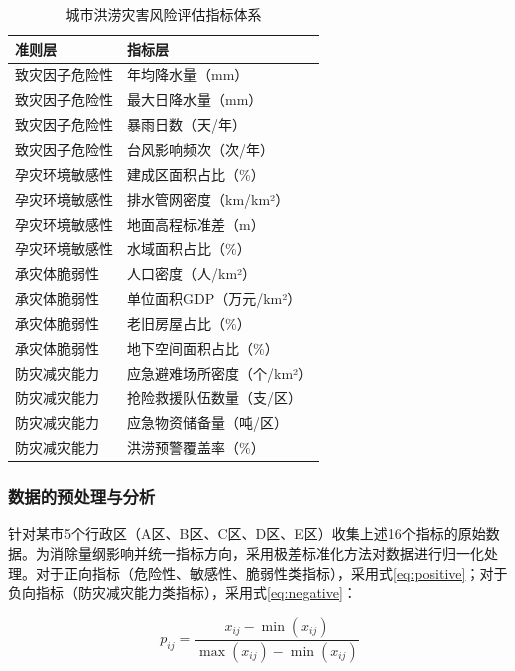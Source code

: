 \documentclass[12pt]{article}
\begin{document}
\begin{table}[H]
    \centering
    \caption{城市洪涝灾害风险评估指标体系}
    \label{tab:indicators}
    \begin{tabularx}{0.85\textwidth}{>{\centering\arraybackslash}X>{\centering\arraybackslash}X}
        \toprule
        准则层 & 指标层 \\
        \midrule
        致灾因子危险性 & 年均降水量（mm） \\
        致灾因子危险性 & 最大日降水量（mm） \\
        致灾因子危险性 & 暴雨日数（天/年） \\
        致灾因子危险性 & 台风影响频次（次/年） \\
        \cmidrule{1-2}
        孕灾环境敏感性 & 建成区面积占比（\%） \\
        孕灾环境敏感性 & 排水管网密度（km/km²） \\
        孕灾环境敏感性 & 地面高程标准差（m） \\
        孕灾环境敏感性 & 水域面积占比（\%） \\
        \cmidrule{1-2}
        承灾体脆弱性 & 人口密度（人/km²） \\
        承灾体脆弱性 & 单位面积GDP（万元/km²） \\
        承灾体脆弱性 & 老旧房屋占比（\%） \\
        承灾体脆弱性 & 地下空间面积占比（\%） \\
        \cmidrule{1-2}
        防灾减灾能力 & 应急避难场所密度（个/km²） \\
        防灾减灾能力 & 抢险救援队伍数量（支/区） \\
        防灾减灾能力 & 应急物资储备量（吨/区） \\
        防灾减灾能力 & 洪涝预警覆盖率（\%） \\
        \bottomrule
    \end{tabularx}
\end{table}

\subsubsection{数据的预处理与分析}
针对某市5个行政区（A区、B区、C区、D区、E区）收集上述16个指标的原始数据。为消除量纲影响并统一指标方向，采用极差标准化方法对数据进行归一化处理。对于正向指标（危险性、敏感性、脆弱性类指标），采用式\eqref{eq:positive}；对于负向指标（防灾减灾能力类指标），采用式\eqref{eq:negative}：

\begin{equation}
    p_{ij} = \frac{x_{ij} - \min(x_{ij})}{\max(x_{ij}) - \min(x_{ij})}
    \label{eq:positive}
\end{equation}
\end{document}

